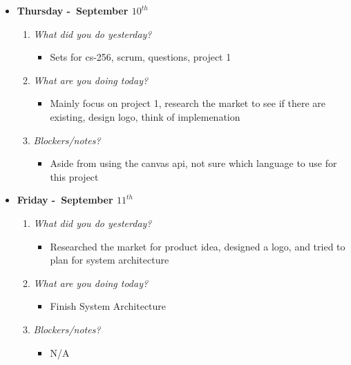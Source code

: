 \textbf{}
\begin{itemize}
  \item[] \textbf{\large Thursday -\ September \(10^{th}\)}
  \begin{enumerate}
    \item \textsl{What did you do yesterday?}
    \begin{itemize}
      \item Sets for cs-256, scrum, questions, project 1
    \end{itemize}
    \item \textsl{What are you doing today?}
    \begin{itemize}
      \item Mainly focus on project 1, research the market to see if there are existing, design logo, think of implemenation
    \end{itemize}
    \item \textsl{Blockers/notes?}
    \begin{itemize}
      \item Aside from using the canvas api, not sure which language to use for this project
    \end{itemize}
  \end{enumerate}
\end{itemize}
\textbf{}
\begin{itemize}
  \item[] \textbf{\large Friday -\ September \(11^{th}\)}
  \begin{enumerate}
    \item \textsl{What did you do yesterday?}
    \begin{itemize}
      \item Researched the market for product idea, designed a logo, and tried to plan for system architecture
    \end{itemize}
    \item \textsl{What are you doing today?}
    \begin{itemize}
      \item Finish System Architecture
    \end{itemize}
    \item \textsl{Blockers/notes?}
    \begin{itemize}
      \item N/A
    \end{itemize}
  \end{enumerate}
\end{itemize}
